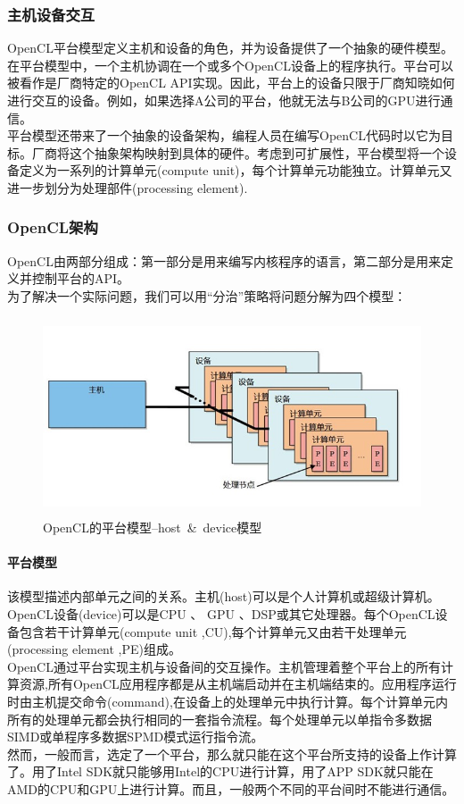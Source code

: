 \documentclass[paper=a4]{ctexart} %
\numberwithin{equation}{section} %
\numberwithin{figure}{section} %
\numberwithin{table}{section} %
\newcommand{\n}{\\\indent}
\begin{document}
\subsubsection{主机设备交互}

OpenCL平台模型定义主机和设备的角色，并为设备提供了一个抽象的硬件模型。 \n
在平台模型中，一个主机协调在一个或多个OpenCL设备上的程序执行。平台可以被看作是厂商特定的OpenCL API实现。因此，平台上的设备只限于厂商知晓如何进行交互的设备。例如，如果选择A公司的平台，他就无法与B公司的GPU进行通信。 \n
平台模型还带来了一个抽象的设备架构，编程人员在编写OpenCL代码时以它为目标。厂商将这个抽象架构映射到具体的硬件。考虑到可扩展性，平台模型将一个设备定义为一系列的计算单元(compute unit)，每个计算单元功能独立。计算单元又进一步划分为处理部件(processing element).

\subsubsection{OpenCL架构}

OpenCL由两部分组成：第一部分是用来编写内核程序的语言，第二部分是用来定义并控制平台的API。\n
为了解决一个实际问题，我们可以用“分治”策略将问题分解为四个模型：

\begin{figure}[htbp]
\centering
\includegraphics[width=4.8in,height=2.3in]{pic/opencl-host-device.png}
\caption{OpenCL的平台模型--host~\&~device模型}
\end{figure}

\paragraph{平台模型} 该模型描述内部单元之间的关系。主机(host)可以是个人计算机或超级计算机。OpenCL设备(device)可以是CPU 、 GPU 、DSP或其它处理器。每个OpenCL设备包含若干计算单元(compute unit ,CU),每个计算单元又由若干处理单元(processing element ,PE)组成。 \n
OpenCL通过平台实现主机与设备间的交互操作。主机管理着整个平台上的所有计算资源,所有OpenCL应用程序都是从主机端启动并在主机端结束的。应用程序运行时由主机提交命令(command),在设备上的处理单元中执行计算。每个计算单元内所有的处理单元都会执行相同的一套指令流程。每个处理单元以单指令多数据SIMD或单程序多数据SPMD模式运行指令流。 \n
然而，一般而言，选定了一个平台，那么就只能在这个平台所支持的设备上作计算了。用了Intel SDK就只能够用Intel的CPU进行计算，用了APP SDK就只能在AMD的CPU和GPU上进行计算。而且，一般两个不同的平台间时不能进行通信。
\end{document}
